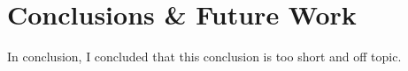 \chapter{Conclusions \& Future Work}\label{ch:conclusion}
In conclusion, I concluded that this conclusion is too short and off topic.
